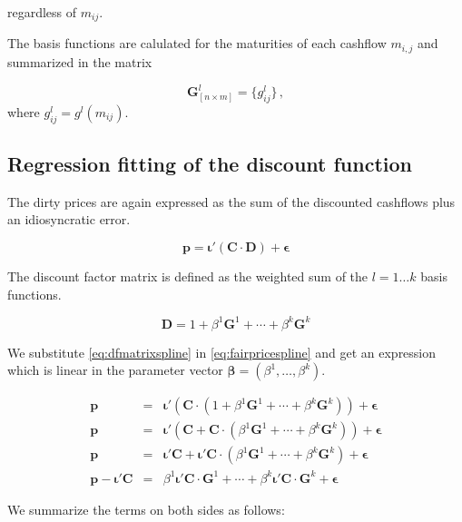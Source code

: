 regardless of $m_{ij}$.

The basis functions are calulated for the maturities of each cashflow $m_{i,j}$ and summarized in the matrix

\begin{equation*}
\label{eq:basisfctmatrix}	
\bm{G}_{\left [n \times m\right]}^l= \{g_{ij}^l\}\,,
\end{equation*}
where $g_{ij}^l=g^l(m_{ij})$.



\subsection{Regression fitting of the discount function}

The dirty prices are again expressed as the sum of the discounted cashflows plus an idiosyncratic error.

\begin{equation}
  \label{eq:fairpricespline}
  \bm{p}= \bm{\iota}'\left(\bm{C}\cdot\bm{D}\right)+ \bm{\epsilon}
\end{equation}

The discount factor matrix is defined as the weighted sum of the $l=1\dots k$ basis functions.

\begin{equation}
  \label{eq:dfmatrixspline}
   \bm{D}=1+\beta^1\bm{G}^1+\cdots + \beta^k\bm{G}^k
\end{equation}

We substitute \eqref{eq:dfmatrixspline} in \eqref{eq:fairpricespline} and get an expression which is linear in the parameter vector $\bm{\beta}=(\beta^1,\dots,\beta^k)$.

\begin{eqnarray*}
  \label{eq:splineparam}
  \bm{p} &=& \bm{\iota}'\left(\bm{C}\cdot\left(1+\beta^1\bm{G}^1+\cdots+\beta^k\bm{G}^k\right)\right)+\bm{\epsilon}\\
  \bm{p} &=& \bm{\iota}'\left(\bm{C}+\bm{C}\cdot\left(\beta^1\bm{G}^1+\cdots+\beta^k\bm{G}^k\right)\right)+\bm{\epsilon}\\
  \bm{p} &=& \bm{\iota}'\bm{C}+\bm{\iota}'\bm{C}\cdot\left(\beta^1\bm{G}^1+\cdots+\beta^k\bm{G}^k\right)+\bm{\epsilon}\\
  \bm{p}- \bm{\iota}'\bm{C} &=& \beta^1\bm{\iota}'\bm{C}\cdot\bm{G}^1+\cdots+\beta^k\bm{\iota}'\bm{C}\cdot\bm{G}^k+\bm{\epsilon}
\end{eqnarray*}


We summarize the terms on both sides as follows:


